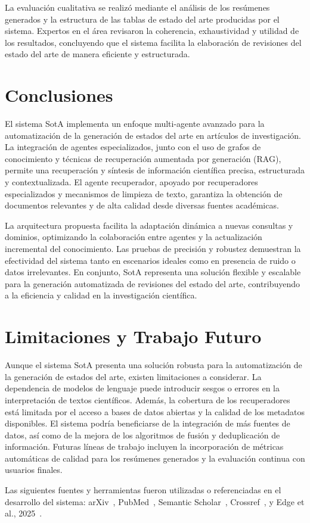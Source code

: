 \documentclass[12pt]{article}
\begin{document}
La evaluación cualitativa se realizó mediante el análisis de los resúmenes generados y la estructura de las tablas de estado del arte producidas por el sistema. Expertos en el área revisaron la coherencia, exhaustividad y utilidad de los resultados, concluyendo que el sistema facilita la elaboración de revisiones del estado del arte de manera eficiente y estructurada.

\section{Conclusiones}

El sistema SotA implementa un enfoque multi-agente avanzado para la automatización de la generación de estados del arte en artículos de investigación. La integración de agentes especializados, junto con el uso de grafos de conocimiento y técnicas de recuperación aumentada por generación (RAG), permite una recuperación y síntesis de información científica precisa, estructurada y contextualizada. El agente recuperador, apoyado por recuperadores especializados y mecanismos de limpieza de texto, garantiza la obtención de documentos relevantes y de alta calidad desde diversas fuentes académicas.

La arquitectura propuesta facilita la adaptación dinámica a nuevas consultas y dominios, optimizando la colaboración entre agentes y la actualización incremental del conocimiento. Las pruebas de precisión y robustez demuestran la efectividad del sistema tanto en escenarios ideales como en presencia de ruido o datos irrelevantes. En conjunto, SotA representa una solución flexible y escalable para la generación automatizada de revisiones del estado del arte, contribuyendo a la eficiencia y calidad en la investigación científica.

\section{Limitaciones y Trabajo Futuro}

Aunque el sistema SotA presenta una solución robusta para la automatización de la generación de estados del arte, existen limitaciones a considerar. La dependencia de modelos de lenguaje puede introducir sesgos o errores en la interpretación de textos científicos. Además, la cobertura de los recuperadores está limitada por el acceso a bases de datos abiertas y la calidad de los metadatos disponibles. El sistema podría beneficiarse de la integración de más fuentes de datos, así como de la mejora de los algoritmos de fusión y deduplicación de información. Futuras líneas de trabajo incluyen la incorporación de métricas automáticas de calidad para los resúmenes generados y la evaluación continua con usuarios finales.

Las siguientes fuentes y herramientas fueron utilizadas o referenciadas en el desarrollo del sistema: arXiv~\cite{arxiv}, PubMed~\cite{pubmed}, Semantic Scholar~\cite{semanticscholar}, Crossref~\cite{crossref}, y Edge et al., 2025~\cite{edge2025localglobalgraphrag}.



\end{document}
